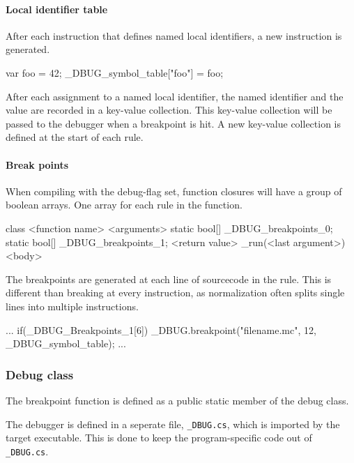\paragraph{Local identifier table}
After each instruction that defines named local identifiers, a new instruction is generated.

\begin{CS}
    var foo = 42;
    _DBUG_symbol_table["foo"] = foo;
\end{CS}

After each assignment to a named local identifier, the named identifier and the value are recorded in a key-value collection. 
This key-value collection will be passed to the debugger when a breakpoint is hit.
A new key-value collection is defined at the start of each rule.

\paragraph{Break points}
When compiling with the debug-flag set, function closures will have a group of boolean arrays.
One array for each rule in the function.

\begin{CS}
    class <function name>{
        <arguments>
        static bool[] _DBUG_breakpoints_0;
        static bool[] _DBUG_breakpoints_1;
        <return value> _run(<last argument>){
            <body> 
        }
    }
\end{CS}

The breakpoints are generated at each line of sourcecode in the rule.
This is different than breaking at every instruction, as normalization often splits single lines into multiple instructions.

\begin{CS}
    ...
    if(_DBUG_Breakpoints_1[6]){
        _DBUG.breakpoint("filename.mc", 12, 
                         _DBUG_symbol_table);
    }
    ...
\end{CS}

\subsubsection{Debug class}
The breakpoint function is defined as a public static member of the debug class.

The debugger is defined in a seperate file, \verb|_DBUG.cs|, which is imported by the target executable.
This is done to keep the program-specific code out of \verb|_DBUG.cs|.

